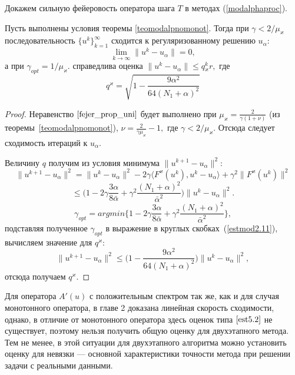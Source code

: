 Докажем сильную фейеровость оператора шага $T$ в методах (\ref{modalphaproc}).
\begin{theorem}
	Пусть выполнены условия теоремы \ref{teomodalpnomonot}. Тогда при $\gamma < 2/\mu_\varkappa$ последовательность $\{u^k\}_{k=1}^\infty$ сходится к регуляризованному решению $u_\alpha$: $$\lim\limits_{k\to\infty}\|u^k-u_\alpha\|=0,$$ а при $\gamma_{opt}=1/\mu_\varkappa.$ справедлива оценка $\|u^k-u_\alpha\|\le q{_\varkappa^k}r,$ где
	$$q^\varkappa=\sqrt{1-\frac{9\alpha^2}{64(N_1+\alpha)^2}}$$
\end{theorem}
\begin{proof} Неравенство $\eqref{fejer_prop_uni}$ будет выполнено при $\mu_\varkappa=\frac{2}{\gamma(1+\nu)}$ (из теоремы~\ref{teomodalpnomonot}), $\nu=\frac{2}{\gamma\mu_\varkappa}-1,$ где $\gamma<2/\mu_\varkappa$. Отсюда следует сходимость итераций к $u_\alpha$.

Величину $q$ получим из условия минимума $\|u^{k+1}-u_\alpha\|^2$:
$$\|u^{k+1}-u_\alpha\|^2=\|u^k-u_\alpha\|^2-2\gamma\langle F^\varkappa(u^k), u^k-u_\alpha\rangle+\gamma^2\|F^\varkappa(u^k)\|^2$$
\begin{equation}\label{estmod2.11}
\le\big(1-2\gamma\frac{3\alpha}{8\bar{\alpha}}+\gamma^2\frac{(N_1+\alpha)^2}{\bar{\alpha}^2}\big)\|u^k-u_\alpha\|^2.
\end{equation}
$$\gamma_{opt}=argmin\{1-2\gamma\frac{3\alpha}{8\bar{\alpha}}+\gamma^2\frac{(N_1+\alpha)^2}{\bar{\alpha}^2}\},$$
подставляя полученное $\gamma_{opt}$ в выражение в круглых скобках~(\ref{estmod2.11}), вычисляем значение для $q^\varkappa$:
$$\|u^{k+1}-u_\alpha\|^2\le\big(1-\frac{9\alpha^2}{64(N_1+\alpha)^2}\big)\|u^k-u_\alpha\|^2,$$ отсюда получаем $q^\varkappa$.
\end{proof}

Для оператора $A'(u)$ с положительным спектром так же, как и для случая монотонного оператора, в главе 2 доказана линейная скорость сходимости, однако, в отличие от монотонного оператора здесь оценок типа $\eqref{est5.2}$ не существует, поэтому нельзя получить общую оценку для двухэтапного метода. Тем не менее, в этой ситуации для двухэтапного алгоритма можно установить оценку для невязки --- основной характеристики точности метода при решении задачи с реальными данными.


